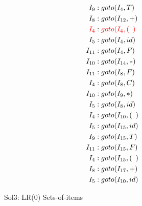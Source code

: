 \documentclass{article}
\newcommand\tab[1][5pt]{\hspace*{#1}}
\begin{document}
\begin{figure}[h!]
\begin{multicols}{2}
\begin{equation*}
\begin{aligned}
I_{9} &: goto(I_4,T) \\
I_8 &: goto(I_{12},+) \\
\color{red} {I_4} &: \color{red} {goto(I_{4},( \tab )} \\
I_5 &: goto(I_{4},id) \\
I_{11} &: goto(I_{4},F) \\
I_{10} &: goto(I_{14},*) \\
I_{11} &: goto(I_{8},F) \\ 
I_{4} &: goto(I_{8},C) \\
I_{10} &: goto(I_{9},*) \\
I_{5} &: goto(I_{8},id) \\
I_{4} &: goto(I_{10},( \tab ) \\
I_{5} &: goto(I_{15},id) \\
I_{9} &: goto(I_{15},T) \\
I_{11} &: goto(I_{15},F) \\
I_{4} &: goto(I_{15},( \tab ) \\
I_{8} &: goto(I_{17},+) \\
I_{5} &: goto(I_{10},id) \\
\end{aligned}
\end{equation*}
\end{multicols}
\caption{Sol3: LR(0) Sets-of-items }
\label{soi3}
\end{figure}
\end{document}
